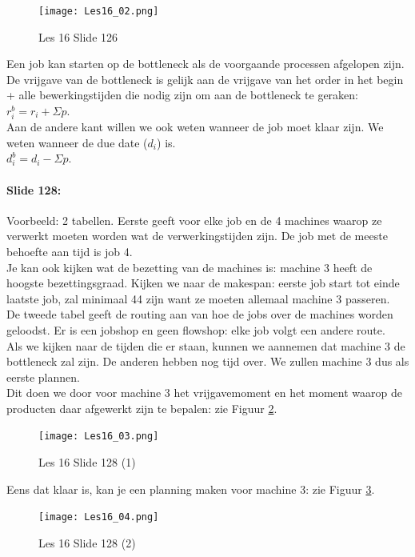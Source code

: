 \documentclass[10pt,a4paper]{report}
\begin{document}
\begin{figure}[h!]
\centering
\texttt{[image: Les16\_02.png]}
\caption{Les 16 Slide 126} 
\label{les16_02}
\end{figure}

Een job kan starten op de bottleneck als de voorgaande processen afgelopen zijn. De vrijgave van de bottleneck is gelijk aan de vrijgave van het order in het begin + alle bewerkingstijden die nodig zijn om aan de bottleneck te geraken: $r_{i}^{b} = r_{i} + \Sigma p$.\\
Aan de andere kant willen we ook weten wanneer de job moet klaar zijn. We weten wanneer de due date ($d_{i}$) is. \\
$d_{i}^{b} = d_{i} - \Sigma p$.

\paragraph{Slide 128:} Voorbeeld: 2 tabellen. Eerste geeft voor elke job en de 4 machines waarop ze verwerkt moeten worden wat de verwerkingstijden zijn. De job met de meeste behoefte aan tijd is job 4.\\
Je kan ook kijken wat de bezetting van de machines is: machine 3 heeft de hoogste bezettingsgraad. Kijken we naar de makespan: eerste job start tot einde laatste job, zal minimaal 44 zijn want ze moeten allemaal machine 3 passeren. \\
De tweede tabel geeft de routing aan van hoe de jobs over de machines worden geloodst. Er is een jobshop en geen flowshop: elke job volgt een andere route.\\
Als we kijken naar de tijden die er staan, kunnen we aannemen dat machine 3 de bottleneck zal zijn. De anderen hebben nog tijd over. We zullen machine 3 dus als eerste plannen. \\
Dit doen we door voor machine 3 het vrijgavemoment en het moment waarop de producten daar afgewerkt zijn te bepalen: zie Figuur \ref{les16_03}.\\

\begin{figure}[h!]
\centering
\texttt{[image: Les16\_03.png]}
\caption{Les 16 Slide 128 (1)} 
\label{les16_03}
\end{figure}

Eens dat klaar is, kan je een planning maken voor machine 3: zie Figuur \ref{les16_04}.\\

\begin{figure}[h!]
\centering
\texttt{[image: Les16\_04.png]}
\caption{Les 16 Slide 128 (2)} 
\label{les16_04}
\end{figure}
\end{document}
